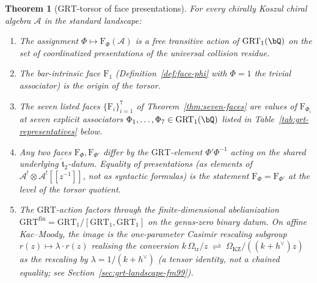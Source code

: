 \documentclass[11pt]{article}
\theoremstyle{plain}
\newtheorem{theorem}{Theorem}[section]
\theoremstyle{definition}
\theoremstyle{remark}
\newcommand{\cA}{\mathcal{A}}
\begin{document}
\begin{theorem}[$\mathrm{GRT}$-torsor of face
presentations]\label{thm:grt-face-torsor}
For every chirally Koszul chiral algebra $\cA$ in the standard
landscape:
\begin{enumerate}[label=\textup{(\roman*)}]
 \item The assignment $\Phi\mapsto\mathrm{F}_\Phi(\cA)$ is a free
 transitive action of $\mathrm{GRT}_1(\bQ)$ on the set of
 coordinatized presentations of the universal collision residue.
 \item The bar-intrinsic face $\mathrm{F}_1$
 (Definition~\textup{\ref{def:face-phi}} with $\Phi=1$ the trivial
 associator) is the origin of the torsor.
 \item The seven listed faces $\{\mathrm{F}_i\}_{i=1}^7$ of
 Theorem~\textup{\ref{thm:seven-faces}} are values of
 $\mathrm{F}_{\Phi_i}$ at seven explicit associators
 $\Phi_1,\ldots,\Phi_7\in\mathrm{GRT}_1(\bQ)$ listed in
 Table~\textup{\ref{tab:grt-representatives}} below.
 \item Any two faces $\mathrm{F}_{\Phi},\mathrm{F}_{\Phi'}$ differ
 by the $\mathrm{GRT}$-element $\Phi'\Phi^{-1}$ acting on the shared
 underlying $\widehat{\mathfrak{t}}_2$-datum. Equality of
 presentations (as elements of
 $\cA^!\otimes\cA^![\![z^{-1}]\!]$, not as syntactic formulas) is
 the statement $\mathrm{F}_\Phi = \mathrm{F}_{\Phi'}$ at the level
 of the torsor quotient.
 \item The $\mathrm{GRT}$-action factors through the
 finite-dimensional abelianization
 $\mathrm{GRT}^{\mathrm{fin}} = \mathrm{GRT}_1/[\mathrm{GRT}_1,\mathrm{GRT}_1]$
 on the genus-zero binary datum. On affine Kac--Moody, the image
 is the one-parameter Casimir rescaling subgroup
 $r(z)\mapsto\lambda\cdot r(z)$ realising the conversion
 $k\,\Omega_{\mathrm{tr}}/z \;\rightleftharpoons\;\Omega_{\mathrm{KZ}}/((k+h^\vee)z)$ as the
 rescaling by $\lambda=1/(k+h^\vee)$ (a tensor identity, not a
 chained equality; see Section~\ref{sec:grt-landscape-fm99}).
\end{enumerate}
\end{theorem}
\end{document}

